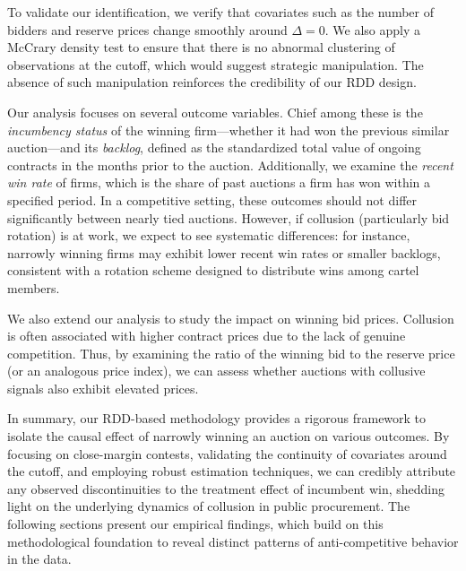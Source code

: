 To validate our identification, we verify that covariates such as the number of bidders and reserve prices change smoothly around $\Delta=0$. We also apply a McCrary density test to ensure that there is no abnormal clustering of observations at the cutoff, which would suggest strategic manipulation. The absence of such manipulation reinforces the credibility of our RDD design.

Our analysis focuses on several outcome variables. Chief among these is the \emph{incumbency status} of the winning firm—whether it had won the previous similar auction—and its \emph{backlog}, defined as the standardized total value of ongoing contracts in the months prior to the auction. Additionally, we examine the \emph{recent win rate} of firms, which is the share of past auctions a firm has won within a specified period. In a competitive setting, these outcomes should not differ significantly between nearly tied auctions. However, if collusion (particularly bid rotation) is at work, we expect to see systematic differences: for instance, narrowly winning firms may exhibit lower recent win rates or smaller backlogs, consistent with a rotation scheme designed to distribute wins among cartel members.

We also extend our analysis to study the impact on winning bid prices. Collusion is often associated with higher contract prices due to the lack of genuine competition. Thus, by examining the ratio of the winning bid to the reserve price (or an analogous price index), we can assess whether auctions with collusive signals also exhibit elevated prices.

In summary, our RDD-based methodology provides a rigorous framework to isolate the causal effect of narrowly winning an auction on various outcomes. By focusing on close-margin contests, validating the continuity of covariates around the cutoff, and employing robust estimation techniques, we can credibly attribute any observed discontinuities to the treatment effect of incumbent win, shedding light on the underlying dynamics of collusion in public procurement. The following sections present our empirical findings, which build on this methodological foundation to reveal distinct patterns of anti-competitive behavior in the data.
